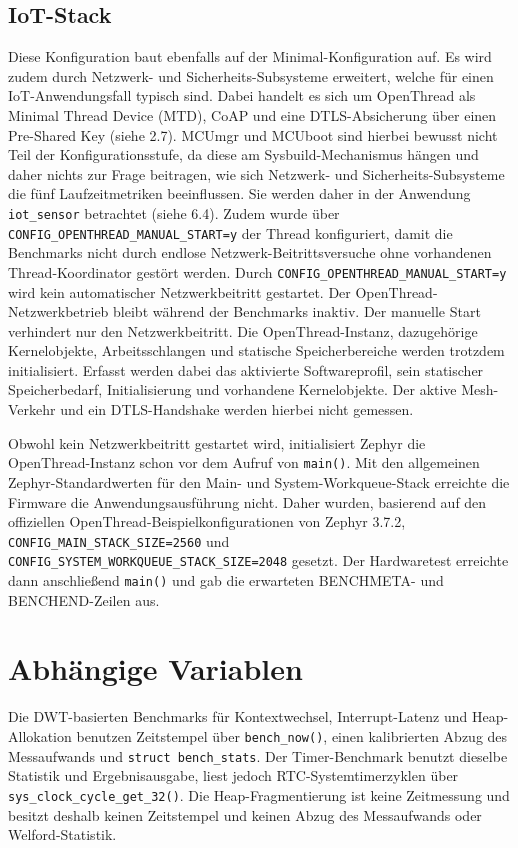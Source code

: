 \subsection{IoT-Stack}
Diese Konfiguration baut ebenfalls auf der Minimal-Konfiguration auf. Es wird zudem durch Netzwerk- und Sicherheits-Subsysteme erweitert, welche f{\"u}r einen IoT-Anwendungsfall typisch sind. Dabei handelt es sich um OpenThread als Minimal Thread Device (MTD), CoAP und eine DTLS-Absicherung {\"u}ber einen Pre-Shared Key (siehe 2.7). MCUmgr und MCUboot sind hierbei bewusst nicht Teil der Konfigurationsstufe, da diese am Sysbuild-Mechanismus h{\"a}ngen und daher nichts zur Frage beitragen, wie sich Netzwerk- und Sicherheits-Subsysteme die f{\"u}nf Laufzeitmetriken beeinflussen. Sie werden daher in der Anwendung \lstinline[style=codeinline]|iot_sensor| betrachtet (siehe 6.4). Zudem wurde {\"u}ber \lstinline[style=codeinline]|CONFIG_OPENTHREAD_MANUAL_START=y| der Thread konfiguriert, damit die Benchmarks nicht durch endlose Netzwerk-Beitrittsversuche ohne vorhandenen Thread-Koordinator gest{\"o}rt werden. Durch \lstinline[style=codeinline]|CONFIG_OPENTHREAD_MANUAL_START=y| wird kein automatischer Netzwerkbeitritt gestartet. Der OpenThread-Netzwerkbetrieb bleibt w{\"a}hrend der Benchmarks inaktiv. Der manuelle Start verhindert nur den Netzwerkbeitritt. Die OpenThread-Instanz, dazugeh{\"o}rige Kernelobjekte, Arbeitsschlangen und statische Speicherbereiche werden trotzdem initialisiert. Erfasst werden dabei das aktivierte Softwareprofil, sein statischer Speicherbedarf, Initialisierung und vorhandene Kernelobjekte. Der aktive Mesh-Verkehr und ein DTLS-Handshake werden hierbei nicht gemessen.

Obwohl kein Netzwerkbeitritt gestartet wird, initialisiert Zephyr die OpenThread-Instanz schon vor dem Aufruf von \lstinline[style=codeinline]|main()|. Mit den allgemeinen Zephyr-Standardwerten f{\"u}r den Main- und System-Workqueue-Stack erreichte die Firmware die Anwendungsausf{\"u}hrung nicht. Daher wurden, basierend auf den offiziellen OpenThread-Beispielkonfigurationen von Zephyr 3.7.2, \lstinline[style=codeinline]|CONFIG_MAIN_STACK_SIZE=2560| und \lstinline[style=codeinline]|CONFIG_SYSTEM_WORKQUEUE_STACK_SIZE=2048| gesetzt. Der Hardwaretest erreichte dann anschlie{\ss}end \lstinline[style=codeinline]|main()| und gab die erwarteten BENCHMETA- und BENCHEND-Zeilen aus.

\section{Abh{\"a}ngige Variablen}
Die DWT-basierten Benchmarks f{\"u}r Kontextwechsel, Interrupt-Latenz und Heap-Allokation benutzen Zeitstempel {\"u}ber \lstinline[style=codeinline]|bench_now()|, einen kalibrierten Abzug des Messaufwands und \lstinline[style=codeinline]|struct bench_stats|. Der Timer-Benchmark benutzt dieselbe Statistik und Ergebnisausgabe, liest jedoch RTC-Systemtimerzyklen {\"u}ber \lstinline[style=codeinline]|sys_clock_cycle_get_32()|. Die Heap-Fragmentierung ist keine Zeitmessung und besitzt deshalb keinen Zeitstempel und keinen Abzug des Messaufwands oder Welford-Statistik.


